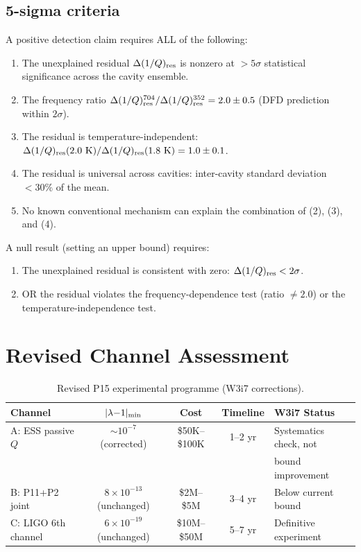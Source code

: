 \documentclass[11pt]{article}
\newcommand{\ee}[1]{\times 10^{#1}}
\newcommand{\lamdiff}{|\lambda{-}1|}
\begin{document}
\subsection{5-sigma criteria}

A positive detection claim requires ALL of the following:
\begin{enumerate}
\item The unexplained residual $\Delta(1/Q)_{\rm res}$ is nonzero at
  $> 5\sigma$ statistical significance across the cavity ensemble.
\item The frequency ratio $\Delta(1/Q)_{\rm res}^{704}/
  \Delta(1/Q)_{\rm res}^{352} = 2.0 \pm 0.5$ (DFD prediction within
  $2\sigma$).
\item The residual is temperature-independent: $\Delta(1/Q)_{\rm res}(2.0~{\rm K})
  / \Delta(1/Q)_{\rm res}(1.8~{\rm K}) = 1.0 \pm 0.1$.
\item The residual is universal across cavities: inter-cavity standard
  deviation $< 30\%$ of the mean.
\item No known conventional mechanism can explain the combination of
  (2), (3), and (4).
\end{enumerate}

A null result (setting an upper bound) requires:
\begin{enumerate}
\item The unexplained residual is consistent with zero: $\Delta(1/Q)_{\rm res}
  < 2\sigma$.
\item OR the residual violates the frequency-dependence test (ratio
  $\neq 2.0$) or the temperature-independence test.
\end{enumerate}

\section{Revised Channel Assessment}
\label{sec:revised-channels}

\begin{table}[H]
\centering
\caption{Revised P15 experimental programme (W3i7 corrections).}
\label{tab:revised-channels}
\begin{tabular}{lcccl}
\toprule
\textbf{Channel} & $\lamdiff_{\rm min}$ & \textbf{Cost} &
\textbf{Timeline} & \textbf{W3i7 Status} \\
\midrule
A: ESS passive $Q$ & $\sim 10^{-7}$ (corrected) & \$50K--\$100K &
  1--2 yr & Systematics check, not \\
& & & & bound improvement \\
B: P11+P2 joint & $8\ee{-13}$ (unchanged) & \$2M--\$5M &
  3--4 yr & Below current bound \\
C: LIGO 6th channel & $6\ee{-19}$ (unchanged) & \$10M--\$50M &
  5--7 yr & Definitive experiment \\
\bottomrule
\end{tabular}
\end{table}
\end{document}
